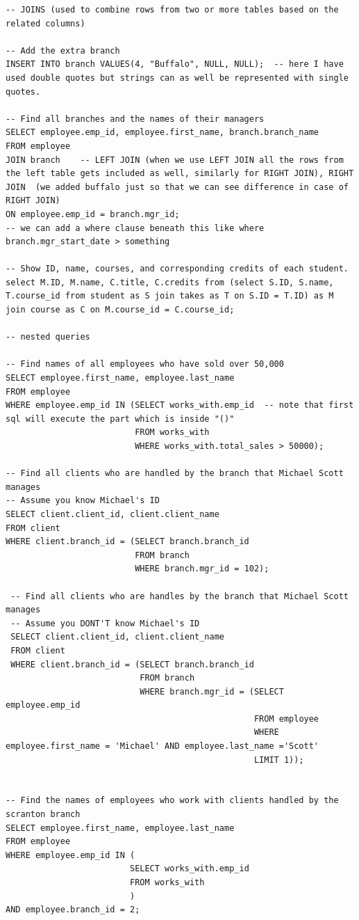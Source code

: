 \documentclass[8pt, a4paper, oneside, twocolumn]{extarticle}
\begin{document}
\begin{verbatim}
-- JOINS (used to combine rows from two or more tables based on the related columns)

-- Add the extra branch
INSERT INTO branch VALUES(4, "Buffalo", NULL, NULL);  -- here I have used double quotes but strings can as well be represented with single quotes.

-- Find all branches and the names of their managers
SELECT employee.emp_id, employee.first_name, branch.branch_name
FROM employee
JOIN branch    -- LEFT JOIN (when we use LEFT JOIN all the rows from the left table gets included as well, similarly for RIGHT JOIN), RIGHT JOIN  (we added buffalo just so that we can see difference in case of RIGHT JOIN)
ON employee.emp_id = branch.mgr_id;
-- we can add a where clause beneath this like where branch.mgr_start_date > something

-- Show ID, name, courses, and corresponding credits of each student.
select M.ID, M.name, C.title, C.credits from (select S.ID, S.name, T.course_id from student as S join takes as T on S.ID = T.ID) as M join course as C on M.course_id = C.course_id;

-- nested queries

-- Find names of all employees who have sold over 50,000
SELECT employee.first_name, employee.last_name
FROM employee
WHERE employee.emp_id IN (SELECT works_with.emp_id  -- note that first sql will execute the part which is inside "()"
                          FROM works_with
                          WHERE works_with.total_sales > 50000);

-- Find all clients who are handled by the branch that Michael Scott manages
-- Assume you know Michael's ID
SELECT client.client_id, client.client_name
FROM client
WHERE client.branch_id = (SELECT branch.branch_id
                          FROM branch
                          WHERE branch.mgr_id = 102);

 -- Find all clients who are handles by the branch that Michael Scott manages
 -- Assume you DONT'T know Michael's ID
 SELECT client.client_id, client.client_name
 FROM client
 WHERE client.branch_id = (SELECT branch.branch_id
                           FROM branch
                           WHERE branch.mgr_id = (SELECT employee.emp_id
                                                  FROM employee
                                                  WHERE employee.first_name = 'Michael' AND employee.last_name ='Scott'
                                                  LIMIT 1));


-- Find the names of employees who work with clients handled by the scranton branch
SELECT employee.first_name, employee.last_name
FROM employee
WHERE employee.emp_id IN (
                         SELECT works_with.emp_id
                         FROM works_with
                         )
AND employee.branch_id = 2;


\end{verbatim}
\end{document}
